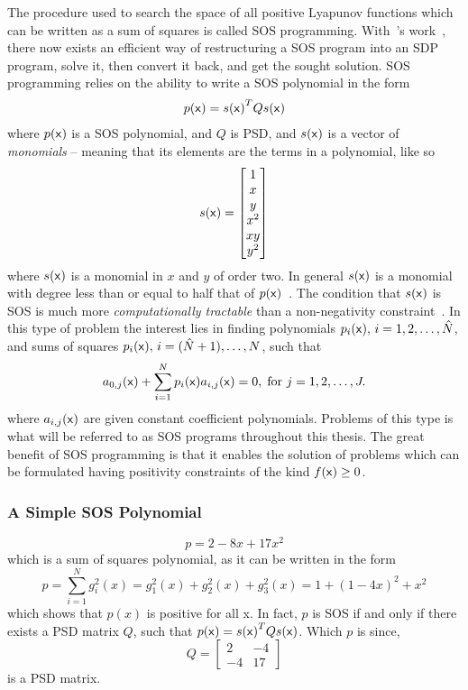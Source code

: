 The procedure used to search the space of all positive Lyapunov functions which
can be written as a sum of squares is called \ac{SOS} programming.
With~\citeauthor{parilloStructuredSemidefinitePrograms}'s
work~\cite{parilloStructuredSemidefinitePrograms}, there now exists an efficient
way of restructuring a \ac{SOS} program into an \ac{SDP} program, solve it, then
convert it back, and get the sought solution. \ac{SOS} programming relies on the
ability to write a SOS polynomial in the form
\begin{align*}
  p({\mathbf{\mathsf{x}}}) &= s{({\mathbf{\mathsf{x}}})}^{T}Qs({\mathbf{\mathsf{x}}})\\
\end{align*}
where \(p({\mathbf{\mathsf{x}}})\) is a \ac{SOS} polynomial, and \(Q\) is \ac{PSD}, and
\(s({\mathbf{\mathsf{x}}})\) is a vector of \textit{monomials} -- meaning that its elements
are the terms in a polynomial, like so
\[
  s({\mathbf{\mathsf{x}}}) = \begin{bmatrix} 1 \\ x \\ y \\ x^2 \\ xy \\ y^2 \end{bmatrix}
\]
where \(s({\mathbf{\mathsf{x}}})\) is a monomial in \(x\) and \(y\) of order two. In general
\(s({\mathbf{\mathsf{x}}})\) is a monomial with degree less than or equal to half that of
\(p({\mathbf{\mathsf{x}}})\)~\cite{parilloStructuredSemidefinitePrograms}\label{monomialdegree}.
The condition that \(s({\mathbf{\mathsf{x}}})\) is \ac{SOS} is much more
\textit{computationally tractable} than a non-negativity
constraint~\cite{parilloStructuredSemidefinitePrograms}. In this type of problem
the interest lies in finding polynomials \(p_i({\mathbf{\mathsf{x}}}), \,
i=1,2,\ldots,\hat{N}\), and sums of squares \(p_i({\mathbf{\mathsf{x}}}), \,
i=(\hat{N}+1),\ldots,N\), such that
\[
  a_{0,j}({\mathbf{\mathsf{x}}}) + \sum_{i=1}^{N}p_{i}({\mathbf{\mathsf{x}}})a_{i,j}({\mathbf{\mathsf{x}}}) = 0, \;
  \text{for } j = 1,2,\ldots,J.
\]
where \(a_{i,j}({\mathbf{\mathsf{x}}})\) are given constant coefficient polynomials. Problems
of this type is what will be referred to as \ac{SOS} programs throughout this
thesis. The great benefit of \ac{SOS} programming is that it enables the
solution of problems which can be formulated having positivity constraints of
the kind \(f({\mathbf{\mathsf{x}}}) \geq 0\).

\subsubsection{A Simple \ac{SOS} Polynomial}
\[
  p = 2 - 8x + 17x^2
\]
which is a sum of squares polynomial, as it can be written in the form
\[
  p = \sum_{i=1}^{N}g_i^2(x) = g_1^2(x) + g_2^2(x) + g_3^2(x)= 1 + {(1-4x)}^2 +
  x^2
\]
which shows that \(p(x)\) is positive for all x. In fact, \(p\) is \ac{SOS} if
and only if there exists a \acl{PSD} matrix \(Q\), such that \(p({\mathbf{\mathsf{x}}}) =
s{({\mathbf{\mathsf{x}}})}^{T}Qs({\mathbf{\mathsf{x}}})\). Which \(p\) is since,
\[
  Q =
  \begin{bmatrix}
    2 & -4 \\
    -4 & 17
  \end{bmatrix}
\]
is a \acl{PSD} matrix.

